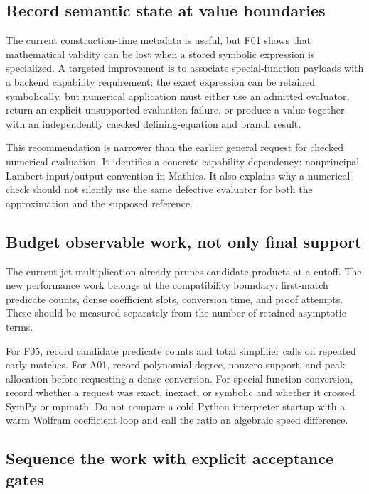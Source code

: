 \documentclass[11pt,letterpaper]{article}
\begin{document}
\subsection{Record semantic state at value boundaries}

The current construction-time metadata is useful, but F01 shows that mathematical validity can be lost when a stored symbolic expression is specialized. A targeted improvement is to associate special-function payloads with a backend capability requirement: the exact expression can be retained symbolically, but numerical application must either use an admitted evaluator, return an explicit unsupported-evaluation failure, or produce a value together with an independently checked defining-equation and branch result.

This recommendation is narrower than the earlier general request for checked numerical evaluation. It identifies a concrete capability dependency: nonprincipal Lambert input/output convention in Mathics. It also explains why a numerical check should not silently use the same defective evaluator for both the approximation and the supposed reference.

\subsection{Budget observable work, not only final support}

The current jet multiplication already prunes candidate products at a cutoff. The new performance work belongs at the compatibility boundary: first-match predicate counts, dense coefficient slots, conversion time, and proof attempts. These should be measured separately from the number of retained asymptotic terms.

For F05, record candidate predicate counts and total simplifier calls on repeated early matches. For A01, record polynomial degree, nonzero support, and peak allocation before requesting a dense conversion. For special-function conversion, record whether a request was exact, inexact, or symbolic and whether it crossed SymPy or mpmath. Do not compare a cold Python interpreter startup with a warm Wolfram coefficient loop and call the ratio an algebraic speed difference.

\subsection{Sequence the work with explicit acceptance gates}
\end{document}

